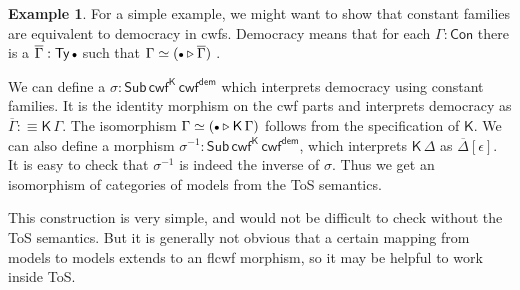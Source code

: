 \documentclass[12pt,a4paper,twoside,openany]{book}
\theoremstyle{remark}
\theoremstyle{definition}
\newtheorem{myexample}{Example}
\theoremstyle{theorem}
\newcommand{\ms}[1]{\mathsf{#1}}
\newcommand{\Con}{\mathsf{Con}}
\newcommand{\Sub}{\mathsf{Sub}}
\newcommand{\Ty}{\mathsf{Ty}}
\newcommand{\ext}{\triangleright}
\newcommand{\emptycon}{\scaleobj{.75}\bullet}
\newcommand{\K}{\mathsf{K}}
\newcommand{\defn}{:\equiv}
\begin{document}
\begin{myexample}
For a simple example, we might want to show that constant families are
equivalent to democracy in cwfs. Democracy means that for each $\Gamma : \Con$
there is a $\overline{\Gamma} : \Ty\,\emptycon$ such that $\Gamma \simeq
(\emptycon\ext\overline{\Gamma})$ \cite[Section~3.1]{flccc-undecidability}.

We can define a $\sigma : \Sub\,\ms{cwf^K}\,\ms{cwf^{dem}}$ which interprets
democracy using constant families. It is the identity morphism on the cwf parts
and interprets democracy as $\overline{\Gamma} \defn \ms{K}\,\Gamma$. The
isomorphism $\Gamma \simeq (\emptycon \ext \K\,\Gamma)$ follows from the
specification of $\K$. We can also define a morphism $\sigma^{-1} :
\Sub\,\ms{cwf^K}\,\ms{cwf^{dem}}$, which interprets $\K\,\Delta$ as
$\overline{\Delta}[\epsilon]$. It is easy to check that $\sigma^{-1}$ is indeed
the inverse of $\sigma$. Thus we get an isomorphism of categories of models
from the ToS semantics.

This construction is very simple, and would not be difficult to check without
the ToS semantics. But it is generally not obvious that a certain mapping from
models to models extends to an flcwf morphism, so it may be helpful
to work inside ToS.
\end{myexample}
\end{document}

